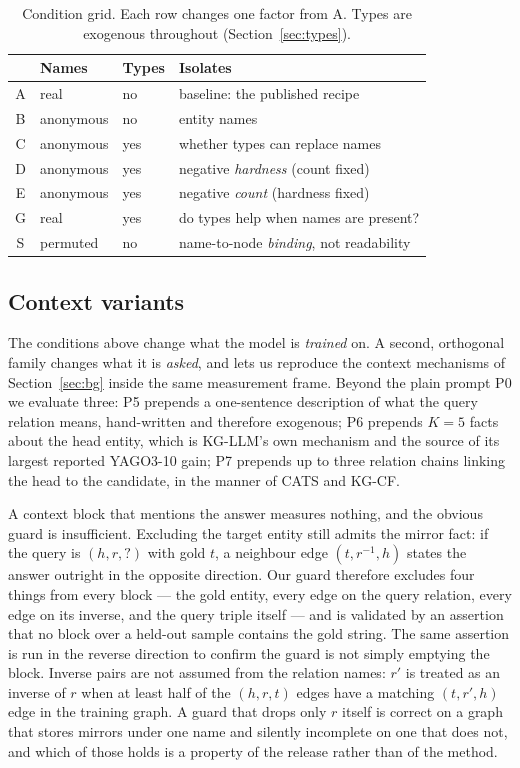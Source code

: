\documentclass[conference]{IEEEtran}
\begin{document}
\begin{table}[t]
\caption{Condition grid. Each row changes one factor from A. Types are
exogenous throughout (Section~\ref{sec:types}).}
\label{tab:cond}
\centering
\footnotesize
\begin{tabular}{@{}clll@{}}
\toprule
& \textbf{Names} & \textbf{Types} & \textbf{Isolates} \\
\midrule
A & real      & no  & baseline: the published recipe \\
B & anonymous & no  & entity names \\
C & anonymous & yes & whether types can replace names \\
D & anonymous & yes & negative \emph{hardness} (count fixed) \\
E & anonymous & yes & negative \emph{count} (hardness fixed) \\
G & real      & yes & do types help when names are present? \\
S & permuted  & no  & name-to-node \emph{binding}, not readability \\
\bottomrule
\end{tabular}
\end{table}

\subsection{Context variants}
\label{sec:context}

The conditions above change what the model is \emph{trained} on. A second,
orthogonal family changes what it is \emph{asked}, and lets us reproduce the
context mechanisms of Section~\ref{sec:bg} inside the same measurement frame.
Beyond the plain prompt P0 we evaluate three: P5 prepends a one-sentence
description of what the query relation means, hand-written and therefore
exogenous; P6 prepends $K=5$ facts about the head entity, which is KG-LLM's own
mechanism and the source of its largest reported YAGO3-10 gain; P7 prepends up
to three relation chains linking the head to the candidate, in the manner of
CATS and KG-CF.

A context block that mentions the answer measures nothing, and the obvious guard
is insufficient. Excluding the target entity still admits the mirror fact: if
the query is $(h, r, ?)$ with gold $t$, a neighbour edge $(t, r^{-1}, h)$ states
the answer outright in the opposite direction. Our guard therefore excludes
four things from every block --- the gold entity, every edge on the query
relation, every edge on its inverse, and the query triple itself --- and is
validated by an assertion that no block over a held-out sample contains the
gold string. The same assertion is run in the reverse direction to confirm the
guard is not simply emptying the block. Inverse pairs are not assumed from the
relation names: $r'$ is treated as an inverse of $r$ when at least half of the
$(h, r, t)$ edges have a matching $(t, r', h)$ edge in the training graph. A
guard that drops only $r$ itself is correct on a graph that stores mirrors
under one name and silently incomplete on one that does not, and which of those
holds is a property of the release rather than of the method.
\end{document}
